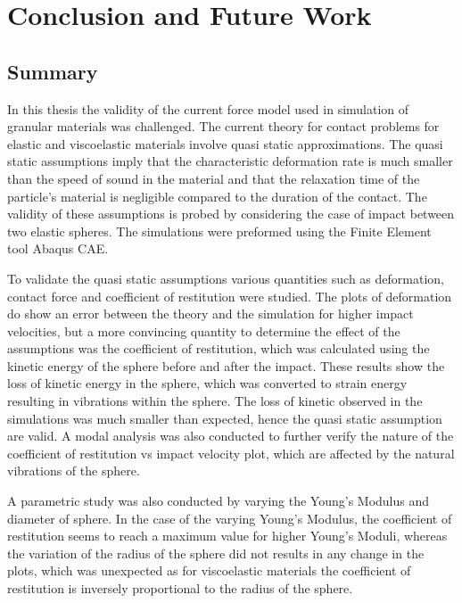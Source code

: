 %
% 


\chapter{Conclusion and Future Work}
\label{sec:conclusion_and_future_work}

\section{Summary}

In this thesis the validity of the current force model used in simulation of granular materials was challenged. The current theory for contact problems for elastic and viscoelastic materials involve quasi static approximations. The quasi static assumptions imply that the characteristic deformation rate is much smaller than the speed of sound in the material and that the relaxation time of the particle's material is negligible compared to the duration of the contact. The validity of these assumptions is probed by considering the case of impact between two elastic spheres. The simulations were preformed using the Finite Element tool Abaqus CAE. 

To validate the quasi static assumptions various quantities such as deformation, contact force and coefficient of restitution were studied. The plots of deformation do show an error between the theory and the simulation for higher impact velocities, but a more convincing quantity to determine the effect of the assumptions was the coefficient of restitution, which was calculated using the kinetic energy of the sphere before and after the impact. These results show the loss of kinetic energy in the sphere, which was converted to strain energy resulting in vibrations within the sphere. The loss of kinetic observed in the simulations was much smaller than expected, hence the quasi static assumption are valid. A modal analysis was also conducted to further verify the nature of the coefficient of restitution vs impact velocity plot, which are affected by the natural vibrations of the sphere. 

A parametric study was also conducted by varying the Young's Modulus and diameter of sphere. In the case of the varying Young's Modulus, the coefficient of restitution seems to reach a maximum value for higher Young's Moduli, whereas the variation of the radius of the sphere did not results in any change in the plots, which was unexpected as for viscoelastic materials the coefficient of restitution is inversely proportional to the radius of the sphere. 


